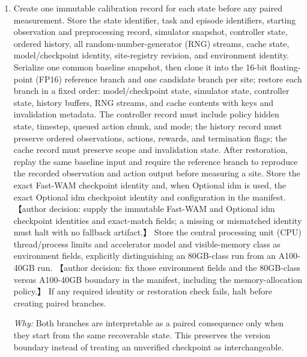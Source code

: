 \documentclass[10pt,a4paper]{article}
\begin{document}
\begin{enumerate}[leftmargin=*,start=1]
  \item Create one immutable calibration record for each state before any paired measurement. Store the state identifier, task and episode identifiers, starting observation and preprocessing record, simulator snapshot, controller state, ordered history, all random-number-generator (RNG) streams, cache state, model/checkpoint identity, site-registry revision, and environment identity. Serialize one common baseline snapshot, then clone it into the 16-bit floating-point (FP16) reference branch and one candidate branch per site;\allowbreak{} restore each branch in a fixed order: model/checkpoint state, simulator state, controller state, history buffers, RNG streams, and cache contents with keys and invalidation metadata. The controller record must include policy hidden state, timestep, queued action chunk, and mode;\allowbreak{} the history record must preserve ordered observations, actions, rewards, and termination flags;\allowbreak{} the cache record must preserve scope and invalidation state. After restoration, replay the same baseline input and require the reference branch to reproduce the recorded observation and action output before measuring a site. Store the exact Fast-WAM checkpoint identity and, when Optional idm is used, the exact Optional idm checkpoint identity and configuration in the manifest. 【author decision: supply the immutable Fast-WAM and Optional idm checkpoint identities and exact-match fields;\allowbreak{} a missing or mismatched identity must halt with no fallback artifact.】 Store the central processing unit (CPU) thread/process limits and accelerator model and visible-memory class as environment fields, explicitly distinguishing an 80GB-class run from an A100-40GB run. 【author decision: fix those environment fields and the 80GB-class versus A100-40GB boundary in the manifest, including the memory-allocation policy.】 If any required identity or restoration check fails, halt before creating paired branches.
\par\emph{Why:} Both branches are interpretable as a paired consequence only when they start from the same recoverable state. This preserves the version boundary instead of treating an unverified checkpoint as interchangeable.
\end{enumerate}
\end{document}
